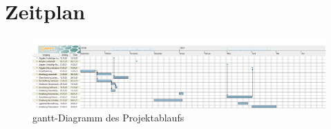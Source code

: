 \section{Zeitplan}
\begin{figure}[ht!]
	\includegraphics[width=1\textwidth]{img/TAR_FKMS_20202021.png}
	\caption[gantt-Diagramm des Projektablaufs]{gantt-Diagramm des Projektablaufs}
 	\label{fig:gantt-diagramm}
\end{figure}
\newpage